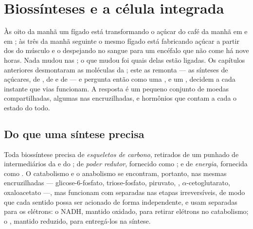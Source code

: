 \chapter{Biossínteses e a célula integrada}\label{ch:b1:biosyntheses-integration}

Às oito da manhã um fígado está transformando o açúcar do café da manhã
em  e em ; às três da manhã seguinte o mesmo fígado
está fabricando açúcar a partir dos  do músculo e o
despejando no sangue para um encéfalo que não come há nove horas. Nada
mudou nas ; o que mudou foi quais delas estão ligadas. Os
capítulos anteriores desmontaram as moléculas da ; este as remonta
--- as sínteses de açúcares, de , de  e de 
--- e pergunta então como uma , e um , decidem a cada
instante que vias funcionam. A resposta é um pequeno conjunto de moedas
compartilhadas, algumas  nas encruzilhadas, e hormônios que
contam a cada  o estado do todo.

\section{Do que uma síntese precisa}

\begin{proposition}\label{prop:b1:biosyntheses-integration:needs}
Toda biossíntese precisa de \emph{esqueletos de carbono}, retirados de
um punhado de intermediários da  e do ; de
\emph{poder redutor}, fornecido como ; e de \emph{energia},
fornecida como . O catabolismo e o anabolismo se encontram, portanto,
nas mesmas encruzilhadas --- glicose-6-fosfato, triose-fosfato,
piruvato, , $\alpha$-cetoglutarato, oxaloacetato ---, mas
funcionam com  separadas nas etapas irreversíveis, de modo que
cada sentido possa ser acionado de forma independente, e usam 
separadas para os elétrons: o NADH, mantido oxidado, para retirar
elétrons no catabolismo; o , mantido reduzido, para entregá-los na
síntese.
\end{proposition}

